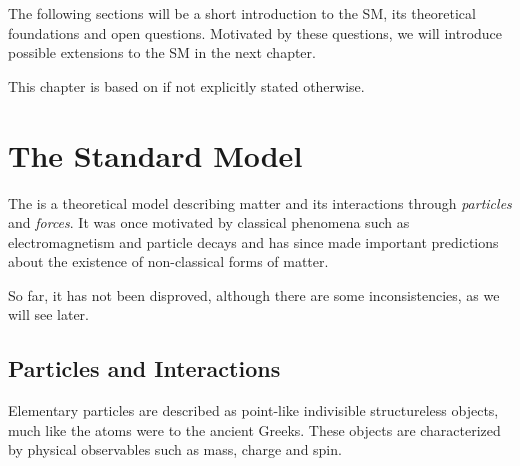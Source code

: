 The following sections will be a short introduction to the \acl{SM}, its theoretical foundations and open questions. Motivated by these questions, we will introduce possible extensions to the \acl{SM} in the next chapter.

This chapter is based on \cite{Hebbeker:SkriptzurElementarteilchenphysik} if not explicitly stated otherwise.

\section{The Standard Model}
The  is a theoretical model describing matter and its interactions through \emph{particles} and \emph{forces}. It was once motivated by classical phenomena such as electromagnetism and particle decays and has since made important predictions about the existence of non-classical forms of matter.

So far, it has not been disproved, although there are some inconsistencies, as we will see later.

\subsection{Particles and Interactions}
Elementary particles are described as point-like indivisible structureless objects, much like the atoms were to the ancient Greeks. These objects are characterized by physical observables such as mass, charge and spin.

